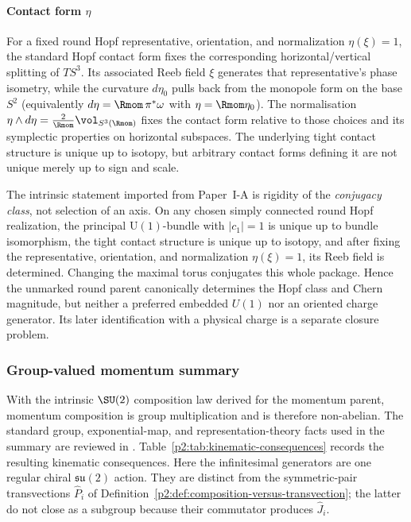 \documentclass[11pt,a4paper]{article}
\begin{document}
\paragraph{\texorpdfstring{Contact form $\eta$}{Contact form}}
For a fixed round Hopf representative, orientation, and normalization
\(\eta(\xi)=1\), the standard Hopf contact form fixes the corresponding
horizontal/vertical splitting of \(TS^3\).  Its associated Reeb field \(\xi\)
generates that representative's phase isometry, while the curvature
\(d\eta_0\) pulls back from the monopole form on the base \(S^2\) (equivalently
\(d\eta = \Rmom\,\pi^*\omega\) with \(\eta=\Rmom\eta_0\)).  The normalisation
\(\eta \wedge d\eta = \frac{2}{\Rmom}\vol_{S^3(\Rmom)}\) fixes the contact
form relative to those choices and its symplectic properties on horizontal
subspaces.  The underlying tight contact structure is unique up to isotopy,
but arbitrary contact forms defining it are not unique merely up to sign and
scale.
\begin{remark}
\label{p2:rem:hopf-rigidity}
The intrinsic statement imported from Paper~I-A is rigidity of the
\emph{conjugacy class}, not selection of an axis.  On any chosen simply
connected round Hopf realization, the principal \(\mathrm U(1)\)-bundle with
\(|c_1|=1\) is unique up to bundle isomorphism, the tight contact structure is
unique up to isotopy, and after fixing the representative, orientation, and
normalization \(\eta(\xi)=1\), its Reeb field is determined.  Changing the
maximal torus conjugates this whole package.  Hence the unmarked round parent
canonically determines the Hopf class and Chern magnitude, but neither a
preferred embedded \(U(1)\) nor an oriented charge generator.  Its later
identification with a physical charge is a separate closure problem.
\end{remark}





\subsubsection{Group-valued momentum summary}
\label{p2c:app:group-valued-momentum}
\label{p2:sec:group-valued-momentum}

With the intrinsic \(\SU(2)\) composition law derived for the momentum parent, momentum
composition is group multiplication and is therefore non-abelian.  The standard
group, exponential-map, and representation-theory facts used in the summary are
reviewed in \cite{Kirillov2004lectures,Hall2015lie,fulton1991representation}.
Table~\ref{p2:tab:kinematic-consequences} records the resulting kinematic
consequences.  Here the infinitesimal generators are one regular chiral
\(\mathfrak{su}(2)\) action.  They are distinct from the symmetric-pair
transvections \(\hat P_i\) of
Definition~\ref{p2:def:composition-versus-transvection}; the latter do not
close as a subgroup because their commutator produces \(\hat J_i\).
\end{document}
